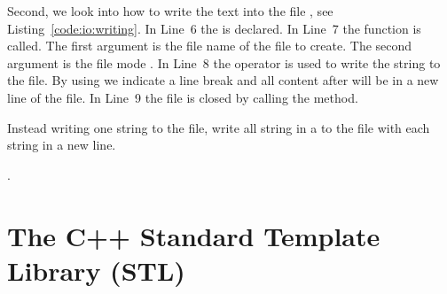 Second, we look into how to write the text  into the file , see Listing~\ref{code:io:writing}. In Line~6 the  is declared. In Line~7 the function  is called. The first argument is the file name of the file to create. The second argument is the file mode . In Line~8 the operator \cpp{<<} is used to write the string to the file. By using  we indicate a line break and all content after will be in a new line of the file. In Line~9 the file is closed by calling the  method.

\begin{exercise}
Instead writing one string to the file, write all string in a  to the file with each string in a new line.
\end{exercise}

. 


\newpage
\printendnotes

\chapter{The C++ Standard Template Library (STL)}
\label{chapter:stl}

